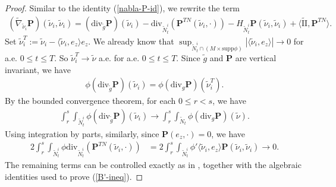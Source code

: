 \documentclass[11pt,letterpaper]{amsart}
\theoremstyle{definition}
\theoremstyle{remark}
\begin{document}
\begin{proof}
Similar to the identity (\ref{nabla-P-id}), we rewrite the term
\begin{align*}
	 (\tilde{\nabla }_{\tilde{\nu }_i} \mathbf{P})(\tilde{\nu }_i, \tilde{\nu }_i) = (\mathrm{div}_{\tilde{g}} \mathbf{P})(\tilde{\nu }_i) - \mathrm{div}_{\tilde{N}^{i}_t}(\mathbf{P}^{TN}(\tilde{\nu }_i, \cdot ) ) - H_{\tilde{N}^{i}_{t}} \mathbf{P}(\tilde{\nu }_i, \tilde{\nu }_i) + \langle \tilde{\mathrm{II}}, \mathbf{P}^{TN} \rangle.
\end{align*} 
Set $\tilde{\nu }_i ^{T} := \tilde{\nu }_i - \langle \tilde{\nu }_i, e_{z} \rangle e_{z}$. We already know that $\sup_{\tilde{N}^{i}_t \cap (M \times \mathrm{supp} \phi )}|\langle \tilde{\nu }_i, e_{z} \rangle| \to 0$ for a.e. $0\leq t \leq T$. So $\tilde{\nu }_i ^{T} \to \tilde{\nu } $ a.e. for a.e. $0\leq t \leq T$. Since $\tilde{g}$ and $\mathbf{P}$ are vertical invariant, we have 
\begin{align*}
	\phi (\mathrm{div}_{\tilde{g}} \mathbf{P})(\tilde{\nu }_i) = \phi (\mathrm{div}_{g} \mathbf{P})(\tilde{\nu }_i ^{T}).
\end{align*} 
By the bounded convergence theorem, for each $0 \leq r <s$, we have
\begin{align*}
	\int_{r}^{s} \int_{\tilde{N}^{i}_{t}} \phi (\mathrm{div}_{\tilde{g}} \mathbf{P})(\tilde{\nu }_i) \to \int_{r}^{s} \int_{\tilde{N}_{t}}\phi (\mathrm{div}_{g} \mathbf{P})(\tilde{\nu }).
\end{align*} 
Using integration by parts, similarly, since $\mathbf{P}(e_{z}, \cdot )=0$, we have
\begin{align*}
	2 \int_{r}^{s}\int_{\tilde{N}^{i}_{t}} \phi \mathrm{div}_{\tilde{N}^{i}_{t}}(\mathbf{P}^{TN}(\tilde{\nu }_i, \cdot ) ) &= 2 \int_{r}^{s}\int_{\tilde{N}^{i}_{t}} \phi ' \langle \tilde{\nu }_i, e_{z} \rangle \mathbf{P}(\tilde{\nu }_{i}, \tilde{\nu }_i ) \to 0.
\end{align*} 
The remaining terms can be controlled exactly as in \cite[Section 6]{Dong26SigmaIMCF}, together with the algebraic identities used to prove (\ref{B'-ineq}). 
\end{proof}
\end{document}
